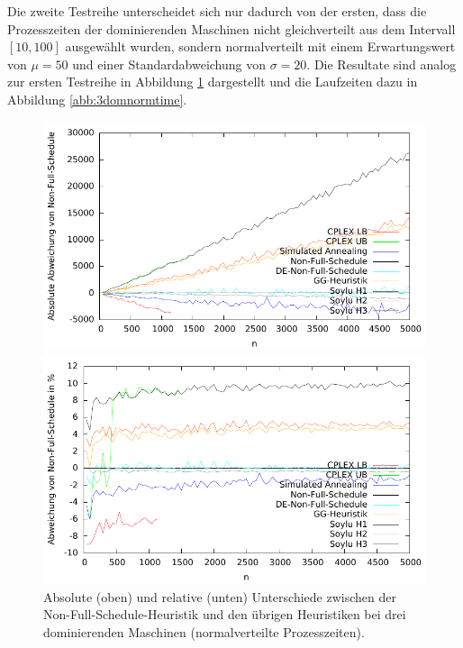 \documentclass{scrreprt}
\begin{document}
Die zweite Testreihe unterscheidet sich nur dadurch von der ersten, dass die Prozesszeiten der dominierenden Maschinen nicht gleichverteilt aus dem Intervall
$[10,100]$ ausgewählt wurden, sondern normalverteilt mit einem Erwartungswert von $\mu=50$ und einer Standardabweichung von $\sigma=20$.
Die Resultate sind analog zur ersten Testreihe in Abbildung \ref{abb:3domnorm} dargestellt und die Laufzeiten dazu in Abbildung \ref{abb:3domnormtime}.
\begin{figure}
    \begin{center}
        \includegraphics[width=.8\textwidth]{../instances/3dom_norm/plot.pdf}
    \end{center}
    \begin{center}
        \includegraphics[width=.8\textwidth]{../instances/3dom_norm/plotrel.pdf}
    \end{center}
    \caption{
        \label{abb:3domnorm}
        Absolute (oben) und relative (unten) Unterschiede zwischen der Non-Full-Schedule-Heuristik und den übrigen Heuristiken
        bei drei dominierenden Maschinen (normalverteilte Prozesszeiten).
    }
\end{figure}
\end{document}

